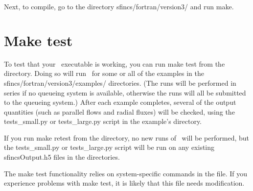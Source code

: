 Next, to compile, go to the directory {\ttfamily sfincs/fortran/version3/} and run {\ttfamily make}.

\section{Make test}
\label{sec:maketest}

To test that your \sfincs~executable is working, you can run {\ttfamily make test}
from the  directory.  Doing so will run
\sfincs~for some or all of the examples in the {\ttfamily sfincs/fortran/version3/examples/} directories.
(The runs will be performed in series if no queueing system is available, otherwise the runs will all
be submitted to the queueing system.)
After each example completes, several of the output quantities (such as parallel flows and radial fluxes)
will be checked, using the
{\ttfamily tests\_small.py} or {\ttfamily tests\_large.py} script in the example's directory.

If you run {\ttfamily make retest} from the  directory,
no new runs of \sfincs~will be performed, but the {\ttfamily tests\_small.py} or {\ttfamily tests\_large.py} script
will be run on any existing {\ttfamily sfincsOutput.h5} files in the  directories.

The {\ttfamily make test} functionality relies on system-specific commands in the
 file.  If you experience
problems with  {\ttfamily make test}, it is likely that this file needs modification.
